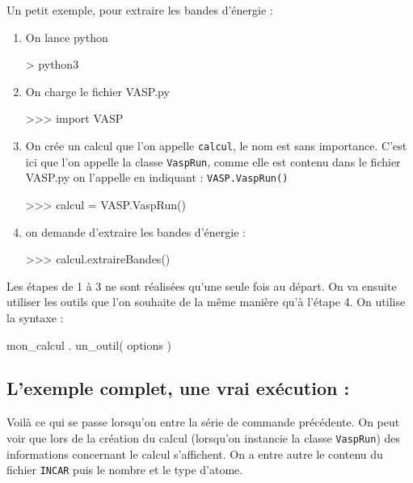 \documentclass[10pt,a4paper,fleqn]{article}
\begin{document}
Un petit exemple, pour extraire les bandes d'énergie :

\begin{enumerate}
	\item On lance python

\begin{console}
 > python3
\end{console}

	\item On charge le fichier VASP.py

\begin{console}
>>> import VASP
\end{console}

	\item On crée un calcul que l'on appelle \verb!calcul!, le nom est sans importance. C'est
		ici que l'on appelle la classe \verb!VaspRun!, comme elle est contenu dans le
		fichier VASP.py on l'appelle en indiquant : \verb!VASP.VaspRun()!

\begin{console}
>>> calcul = VASP.VaspRun()
\end{console}

	\item on demande d'extraire les bandes d'énergie :

\begin{console}
>>> calcul.extraireBandes()
\end{console} 

\end{enumerate}

Les étapes de 1 à 3 ne sont réalisées qu'une seule fois au départ. On va ensuite utiliser les outils
que l'on souhaite de la même manière qu'à l'étape 4. On utilise la syntaxe :

\begin{console}
	mon_calcul . un_outil( options )
\end{console}

\subsection{L'exemple complet, une vrai exécution :}

Voilà ce qui se passe lorsqu'on entre la série de commande précédente. On peut voir que lors de la
création du calcul (lorsqu'on instancie la classe \verb!VaspRun!) des informations concernant le
calcul s'affichent. On a entre autre le contenu du fichier \verb!INCAR! puis le nombre et le type
d'atome.
\end{document}
